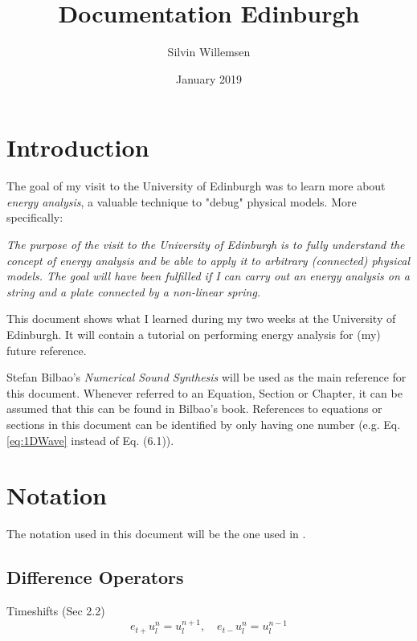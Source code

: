 \documentclass{article}
\title{Documentation Edinburgh}
\author{Silvin Willemsen}
\date{January 2019}
\begin{document}
\maketitle

\section{Introduction}\label{sec:introduction}
The goal of my visit to the University of Edinburgh was to learn more about \textit{energy analysis}, a valuable technique to "debug" physical models. More specifically:

\begin{center}
    \textit{The purpose of the visit to the University of Edinburgh is to fully understand the concept of energy analysis and be able to apply it to arbitrary (connected) physical models. The goal will have been fulfilled if I can carry out an energy analysis on a string and a plate connected by a non-linear spring.}
\end{center}

This document shows what I learned during my two weeks at the University of Edinburgh. It will contain a tutorial on performing energy analysis for (my) future reference. 

Stefan Bilbao's \textit{Numerical Sound Synthesis} \cite{Bilbao2009} will be used as the main reference for this document. Whenever referred to an Equation, Section or Chapter, it can be assumed that this can be found in Bilbao's book. References to equations or sections in this document can be identified by only having one number (e.g. Eq. \eqref{eq:1DWave} instead of Eq. (6.1)).


\section{Notation}\label{sec:notation} 
The notation used in this document will be the one used in \cite{Bilbao2009}. 

\subsection{Difference Operators} 
Timeshifts (Sec 2.2)
\begin{equation}
    e_{t+}u_l^n = u_l^{n+1}, \quad e_{t-}u_l^n = u_l^{n-1}
\end{equation}
\end{document}
